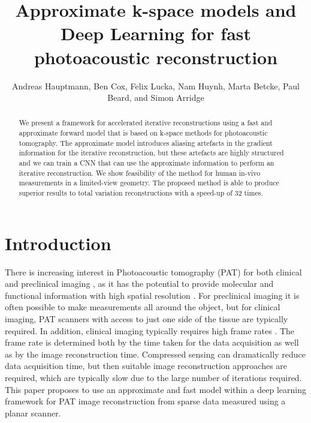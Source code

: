\documentclass[runningheads]{llncs}
\begin{document}
\title{Approximate k-space models and Deep Learning for fast photoacoustic reconstruction}


\author{Andreas Hauptmann, Ben Cox, Felix Lucka, Nam Huynh, Marta Betcke, Paul Beard, and Simon Arridge}




\maketitle
\vspace{-0.5em}
\begin{abstract}
We present a framework for accelerated iterative reconstructions using a fast and approximate forward model that is based on k-space methods for photoacoustic tomography. The approximate model introduces aliasing artefacts in the gradient information for the iterative reconstruction, but these artefacts are highly structured and we can train a CNN that can use the approximate information to perform an iterative reconstruction. We show feasibility of the method for human in-vivo measurements in a limited-view geometry. The proposed method is able to produce superior results to total variation reconstructions with a speed-up of 32 times.
\end{abstract}



\section{Introduction}
There is increasing interest in Photoacoustic tomography (PAT) for both clinical and preclinical imaging \cite{Upputuri2016}, as it has the potential to provide molecular and functional information with high spatial resolution \cite{Beard:2011if}. For preclinical imaging it is often possible to make measurements all around the object, but for clinical imaging, PAT scanners with access to just one side of the tissue are typically required. In addition, clinical imaging typically requires high frame rates \cite{Choi2018}.  The frame rate is determined both by the time taken for the data acquisition as well as by the image reconstruction time. Compressed sensing can dramatically reduce data acquisition time, but then suitable image reconstruction approaches are required, which are typically slow due to the large number of iterations required. This paper proposes to use an approximate and fast model within a deep learning framework for PAT image reconstruction from sparse data measured using a planar scanner.
\end{document}

